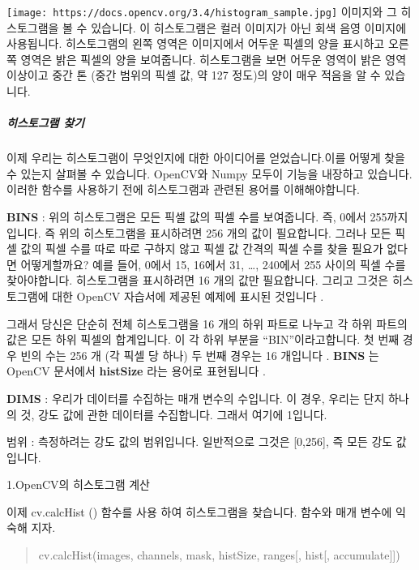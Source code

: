 \documentclass[11pt]{article}
\begin{document}
\texttt{[image: https://docs.opencv.org/3.4/histogram\_sample.jpg]}
이미지와 그 히스토그램을 볼 수 있습니다. 이 히스토그램은 컬러 이미지가
아닌 회색 음영 이미지에 사용됩니다. 히스토그램의 왼쪽 영역은 이미지에서
어두운 픽셀의 양을 표시하고 오른쪽 영역은 밝은 픽셀의 양을 보여줍니다.
히스토그램을 보면 어두운 영역이 밝은 영역 이상이고 중간 톤 (중간 범위의
픽셀 값, 약 127 정도)의 양이 매우 적음을 알 수 있습니다.

\hypertarget{uxd788uxc2a4uxd1a0uxadf8uxb7a8-uxcc3euxae30}{%
\subparagraph{히스토그램
찾기}\label{uxd788uxc2a4uxd1a0uxadf8uxb7a8-uxcc3euxae30}}

이제 우리는 히스토그램이 무엇인지에 대한 아이디어를 얻었습니다.이를
어떻게 찾을 수 있는지 살펴볼 수 있습니다. OpenCV와 Numpy 모두이 기능을
내장하고 있습니다. 이러한 함수를 사용하기 전에 히스토그램과 관련된
용어를 이해해야합니다.

\textbf{BINS} : 위의 히스토그램은 모든 픽셀 값의 픽셀 수를 보여줍니다.
즉, 0에서 255까지입니다. 즉 위의 히스토그램을 표시하려면 256 개의 값이
필요합니다. 그러나 모든 픽셀 값의 픽셀 수를 따로 따로 구하지 않고 픽셀
값 간격의 픽셀 수를 찾을 필요가 없다면 어떻게할까요? 예를 들어, 0에서
15, 16에서 31, \ldots{}, 240에서 255 사이의 픽셀 수를 찾아야합니다.
히스토그램을 표시하려면 16 개의 값만 필요합니다. 그리고 그것은
히스토그램에 대한 OpenCV 자습서에 제공된 예제에 표시된 것입니다 .

그래서 당신은 단순히 전체 히스토그램을 16 개의 하위 파트로 나누고 각
하위 파트의 값은 모든 하위 픽셀의 합계입니다. 이 각 하위 부분을
``BIN''이라고합니다. 첫 번째 경우 빈의 수는 256 개 (각 픽셀 당 하나) 두
번째 경우는 16 개입니다 . \textbf{BINS} 는 OpenCV 문서에서
\textbf{histSize} 라는 용어로 표현됩니다 .

\textbf{DIMS} : 우리가 데이터를 수집하는 매개 변수의 수입니다. 이 경우,
우리는 단지 하나의 것, 강도 값에 관한 데이터를 수집합니다. 그래서 여기에
1입니다.

범위 : 측정하려는 강도 값의 범위입니다. 일반적으로 그것은 {[}0,256{]},
즉 모든 강도 값입니다.

1.OpenCV의 히스토그램 계산

이제 cv.calcHist () 함수를 사용 하여 히스토그램을 찾습니다. 함수와 매개
변수에 익숙해 지자.

\begin{quote}
cv.calcHist(images, channels, mask, histSize, ranges{[}, hist{[},
accumulate{]}{]})
\end{quote}
\end{document}
